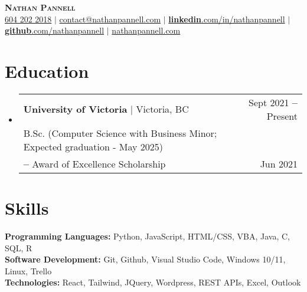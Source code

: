 \documentclass[letterpaper,11pt]{article}
\makeatletter
\newcommand{\resumeEducationHeading}[6]{
  \vspace{-2pt}\item
    \begin{tabular*}{0.97\textwidth}[t]{l@{\extracolsep{\fill}}r}
      #1 & #2 \\
      \small#3 & \small #4 \\
      \small#5 & \small #6 \\
    \end{tabular*}\vspace{-5pt}
}
\newcommand{\resumeSubHeadingListStart}{\begin{itemize}[leftmargin=0.15in, label={}]}
\newcommand{\resumeSubHeadingListEnd}{\end{itemize}}
\makeatother
\begin{document}

\begin{center}
    \textbf{\Huge \scshape Nathan Pannell} \\ \vspace{10pt}
    \small
    \hspace{.5pt} \href{tel:16042022018}{604 202 2018}
    $|$
    \hspace{.5pt} \href{mailto:contact@nathanpannell.com}{contact@nathanpannell.com}
    $|$
    \hspace{.5pt} \href{https://www.linkedin.com/in/nathanpannell}{\textbf{linkedin}.com/in/nathanpannell}
    $|$
    \hspace{.5pt} \href{https://github.com/nathanpannell}{\textbf{github}.com/nathanpannell}
    $|$
    \hspace{.5pt} \href{https://nathanpannell.com}{nathanpannell.com}
\end{center}


\section{Education}
  \vspace{3pt}
  \resumeSubHeadingListStart
    \resumeEducationHeading
      {\textbf{University of Victoria} $|$ Victoria, BC}{Sept 2021 \textbf{--} Present}
      {B.Sc. (Computer Science with Business Minor; Expected graduation - May 2025)}{}
      {\textbf{--} Award of Excellence Scholarship}{Jun 2021}
  \resumeSubHeadingListEnd


\section{Skills}
  \vspace{2pt}
  \resumeSubHeadingListStart
    \small{\item{
        \textbf{Programming Languages:}{ Python, JavaScript, HTML/CSS, VBA, Java, C, SQL, R} \\ \vspace{3pt}
        \textbf{Software Development:}{ Git, Github, Visual Studio Code, Windows 10/11, Linux, Trello } \\ \vspace{3pt}
        \textbf{Technologies:}{ React, Tailwind, JQuery, Wordpress, REST APIs, Excel, Outlook } \\ \vspace{3pt}
    }}
  \resumeSubHeadingListEnd
  
\end{document}
